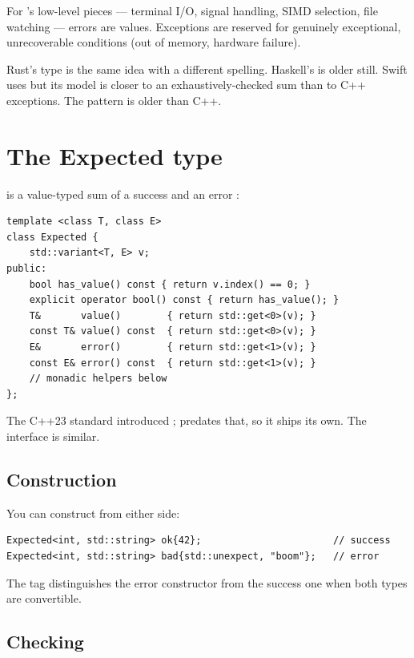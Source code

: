 For \maya{}'s low-level pieces --- terminal I/O, signal handling,
SIMD selection, file watching --- errors are values. Exceptions
are reserved for genuinely exceptional, unrecoverable conditions
(out of memory, hardware failure).

\begin{funfact}
Rust's  type is the same idea with a different
spelling. Haskell's  is older still. Swift uses
 but its model is closer to an exhaustively-checked
sum than to C++ exceptions. The pattern is older than C++.
\end{funfact}

\section{The Expected type}

 is a value-typed sum of a success
 and an error :

\begin{lstlisting}
template <class T, class E>
class Expected {
    std::variant<T, E> v;
public:
    bool has_value() const { return v.index() == 0; }
    explicit operator bool() const { return has_value(); }
    T&       value()        { return std::get<0>(v); }
    const T& value() const  { return std::get<0>(v); }
    E&       error()        { return std::get<1>(v); }
    const E& error() const  { return std::get<1>(v); }
    // monadic helpers below
};
\end{lstlisting}

The C++23 standard introduced ; \maya{}
predates that, so it ships its own. The interface is similar.

\subsection*{Construction}

You can construct from either side:

\begin{lstlisting}
Expected<int, std::string> ok{42};                       // success
Expected<int, std::string> bad{std::unexpect, "boom"};   // error
\end{lstlisting}

The  tag distinguishes the error constructor
from the success one when both types are convertible.

\subsection*{Checking}

